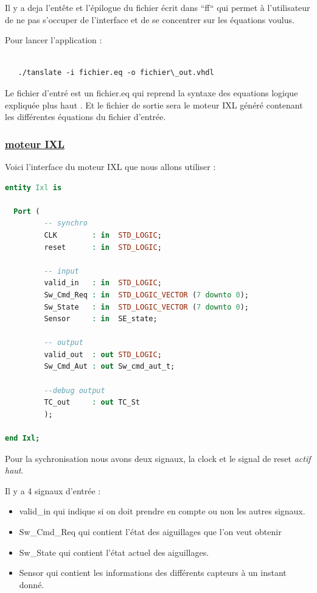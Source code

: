 \medskip

Il y a deja l'entête et l'épilogue du fichier écrit dans ``ff`` qui
permet à l'utilisateur de ne pas s'occuper de l'interface et de se
concentrer sur les équations voulus.  

\medskip

Pour lancer l'application : 

\begin{lstlisting}

   ./tanslate -i fichier.eq -o fichier\_out.vhdl

\end{lstlisting}




Le fichier d'entré est un fichier.eq qui reprend la syntaxe des
equations logique expliquée plus haut \cite{}.
Et le fichier de sortie sera le moteur IXL généré contenant les
différentes équations du fichier d'entrée.

\newpage

\subsubsection{\underline{moteur IXL}}
\label{sec:IXL}

Voici l'interface du moteur IXL que nous allons utiliser :

\begin{lstlisting}[language=vhdl]
entity Ixl is  

  Port (
         -- synchro   
         CLK        : in  STD_LOGIC;
         reset      : in  STD_LOGIC;

         -- input
         valid_in   : in  STD_LOGIC; 
         Sw_Cmd_Req : in  STD_LOGIC_VECTOR (7 downto 0);
         Sw_State   : in  STD_LOGIC_VECTOR (7 downto 0);
         Sensor     : in  SE_state;
         
         -- output
         valid_out  : out STD_LOGIC;
         Sw_Cmd_Aut : out Sw_cmd_aut_t;

         --debug output
         TC_out     : out TC_St
         );

end Ixl;

\end{lstlisting}

Pour la sychronisation nous avons deux signaux, la clock et le signal
de reset \emph{actif haut}.

Il y a 4 signaux d'entrée :

\begin{itemize}
  \item valid\_in qui indique si on doit prendre en compte ou non les
    autres signaux.
  \item Sw\_Cmd\_Req qui contient l'état des aiguillages que l'on veut obtenir
  \item Sw\_State qui contient l'état actuel des aiguillages.
  \item Sensor qui contient les informations des différents capteurs à
    un instant donné.
\end{itemize}  

